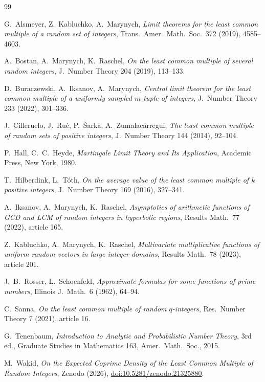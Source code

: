 \documentclass[11pt]{article}
\theoremstyle{remark}
\begin{document}
\begin{thebibliography}{99}

G.~Alsmeyer, Z.~Kabluchko, A.~Marynych, \emph{Limit theorems for the least common multiple of a random set of integers}, Trans.\ Amer.\ Math.\ Soc.\ 372 (2019), 4585--4603.

A.~Bostan, A.~Marynych, K.~Raschel, \emph{On the least common multiple of several random integers}, J.\ Number Theory 204 (2019), 113--133.

D.~Buraczewski, A.~Iksanov, A.~Marynych, \emph{Central limit theorem for the least common multiple of a uniformly sampled $m$-tuple of integers}, J.\ Number Theory 233 (2022), 301--336.

J.~Cilleruelo, J.~Ru\'e, P.~\v{S}arka, A.~Zumalac\'arregui, \emph{The least common multiple of random sets of positive integers}, J.\ Number Theory 144 (2014), 92--104.

P.~Hall, C.~C.~Heyde, \emph{Martingale Limit Theory and Its Application}, Academic Press, New York, 1980.

T.~Hilberdink, L.~T\'oth, \emph{On the average value of the least common multiple of $k$ positive integers}, J.\ Number Theory 169 (2016), 327--341.

A.~Iksanov, A.~Marynych, K.~Raschel, \emph{Asymptotics of arithmetic functions of GCD and LCM of random integers in hyperbolic regions}, Results Math.\ 77 (2022), article 165.

Z.~Kabluchko, A.~Marynych, K.~Raschel, \emph{Multivariate multiplicative functions of uniform random vectors in large integer domains}, Results Math.\ 78 (2023), article 201.

J.~B.~Rosser, L.~Schoenfeld, \emph{Approximate formulas for some functions of prime numbers}, Illinois J.\ Math.\ 6 (1962), 64--94.

C.~Sanna, \emph{On the least common multiple of random $q$-integers}, Res.\ Number Theory 7 (2021), article 16.

G.~Tenenbaum, \emph{Introduction to Analytic and Probabilistic Number Theory}, 3rd ed., Graduate Studies in Mathematics 163, Amer.\ Math.\ Soc., 2015.

M.~Wakid, \emph{On the Expected Coprime Density of the Least Common Multiple of Random Integers}, Zenodo (2026), \href{https://doi.org/10.5281/zenodo.21325880}{doi:10.5281/zenodo.21325880}.

\end{thebibliography}
\end{document}
